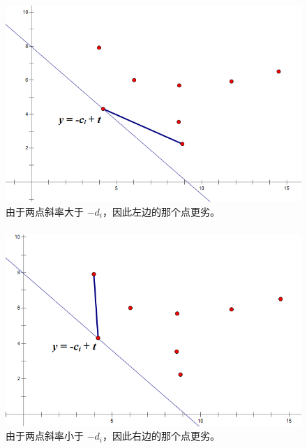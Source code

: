 \documentclass[9pt, UTF8]{beamer} %
\newcommand \fts {\frametitle{\insertsubsection}}
\begin{document}
	\begin{frame}
		\fts

		\begin{figure}
			\centering
			\includegraphics[scale=0.35]{pic/pic6.png}
			\caption{由于两点斜率大于 $-d_i$，因此左边的那个点更劣。}
		\end{figure}
	\end{frame}

	\begin{frame}
		\fts

		\begin{figure}
			\centering
			\includegraphics[scale=0.35]{pic/pic7.png}
			\caption{由于两点斜率小于 $-d_i$，因此右边的那个点更劣。}
		\end{figure}
	\end{frame}
\end{document}
